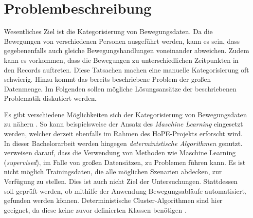 \clearpage
\section{Problembeschreibung}
\label{2-Problembeschreibung}
Wesentliches Ziel ist die Kategorisierung von Bewegungsdaten.
Da die Bewegungen von verschiedenen Personen ausgeführt werden,
kann es sein, dass gegebenenfalls auch gleiche Bewegungshandlungen voneinander abweichen.
Zudem kann es vorkommen, dass die Bewegungen zu unterschiedlichen Zeitpunkten in den Records auftreten.
Diese Tatsachen machen eine manuelle Kategorisierung oft schwierig.
Hinzu kommt das bereits beschriebene Problem der großen Datenmenge.
Im Folgenden sollen mögliche Lösungsansätze der beschriebenen Problematik diskutiert werden.

Es gibt verschiedene Möglichkeiten sich der Kategorisierung von Bewegungsdaten zu nähern \citet{aghabozorgi_time-series_2015}.
So kann beispielsweise der Ansatz des \emph{Maschine Learning} eingesetzt werden,
welcher derzeit ebenfalls im Rahmen des HoPE-Projekts erforscht \citep{plischke_master_2022} wird.
In dieser Bachelorarbeit werden hingegen \emph{deterministische Algorithmen} genutzt.
\citet{aghabozorgi_time-series_2015} verweisen darauf, dass die Verwendung von Methoden
wie Maschine Learning (\emph{supervised}), im Falle von großen Datensätzen, zu Problemen führen kann.
Es ist nicht möglich Trainingsdaten, die alle möglichen Szenarien abdecken, zur Verfügung zu stellen.
Dies ist auch nicht Ziel der Untersuchungen.
Stattdessen soll geprüft werden,
ob mithilfe der Anwendung Bewegungsabläufe automatisiert, gefunden werden können.
Deterministische Cluster-Algorithmen sind hier geeignet,
da diese keine zuvor definierten Klassen benötigen \citep{aghabozorgi_time-series_2015}.

